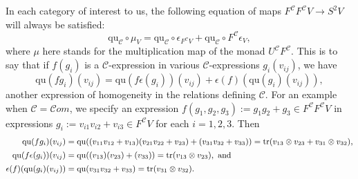 \documentclass[11pt]{amsart} \renewcommand{\baselinestretch}{1.4}
\theoremstyle{plain}
\theoremstyle{definition}
\DeclareMathOperator{\trace}{tr}
\renewcommand{\to}{\longrightarrow}
\newcommand{\scrC}{\mathscr{C}}
\newcommand{\calc}{\mathcal{C}}
\newcommand{\quadratic}{\mathrm{qu}}
\newcommand{\algs}{{\scrC\!\textit{om}}}
\begin{document}
\begin{Pi-algebras and cohomology algebras}
In each category of interest to us, the following equation of maps $F^\calc F^\calc V\to S^2 V$ will always be satisfied:
\[\quadratic_\calc\circ\mu_V=\quadratic_\calc\circ \epsilon_{F^\calc V} +\quadratic_\calc\circ {F^\calc \epsilon_V},\]
where $\mu$ here stands for the multiplication map of the monad $U^\calc F^\calc $. This is to say that if  $f(g_i)$ is a $\calc$-expression in various $\calc$-expressions $g_i(v_{ij})$, we have 
\[\quadratic(fg_i)(v_{ij})=\quadratic(f\epsilon(g_i))(v_{ij})+\epsilon(f)(\quadratic(g_i)(v_{ij})),\]
another expression of homogeneity in the relations defining $\calc$. For an example when $\calc=\algs$, we specify an expression $f(g_1,g_2,g_3):=g_1g_2+g_3\in F^\calc F^\calc V$ in expressions $g_i:=v_{i1}v_{i2}+v_{i3}\in F^\calc V$ for each $i=1,2,3$. Then
\begin{alignat*}{2}
\textup{\small$\quadratic(fg_i)(v_{ij})={}$}
&
\textup{\small$\quadratic((v_{11}v_{12}+v_{13})(v_{21}v_{22}+v_{23})+(v_{31}v_{32}+v_{33}))=\trace(v_{13}\otimes v_{23}+v_{31}\otimes v_{32}),$}
\\
\textup{\small$\quadratic(f\epsilon(g_i))(v_{ij})={}$}
&
\textup{\small$\quadratic((v_{13})(v_{23})+(v_{33}))=\trace(v_{13}\otimes v_{23}),\textup{ and}$}
\\
\textup{\small$\epsilon(f)(\quadratic(g_i)(v_{ij}))={}$}
&
\textup{\small$\quadratic(v_{31}v_{32}+v_{33})=\trace(v_{31}\otimes v_{32}).$}
\end{alignat*}










\end{Pi-algebras and cohomology algebras}
\end{document}
